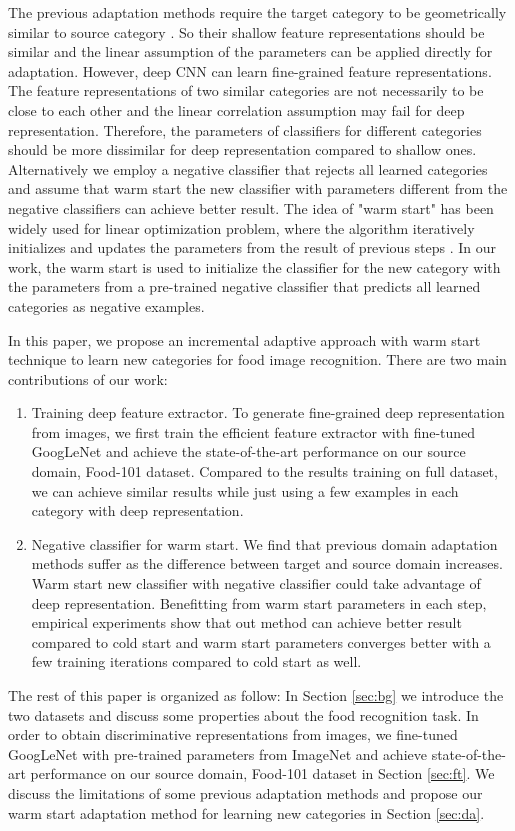 The previous adaptation methods require the target category to be geometrically similar to source category \cite{aytar2011tabula}. So their shallow feature representations should be similar and the linear assumption of the parameters can be applied directly for adaptation.
However, deep CNN can learn fine-grained feature representations. The feature representations of two similar categories are not necessarily to be close to each other and the linear correlation assumption may fail for deep representation. Therefore, the parameters of classifiers for different categories should be more dissimilar for deep representation compared to shallow ones. Alternatively we employ a negative classifier that rejects all learned categories and assume that warm start the new classifier with parameters different from the negative classifiers can achieve better result.
The idea of "warm start" has been widely used for linear optimization problem, where the algorithm iteratively initializes and updates the parameters from the result of previous steps \cite{yildirim2002warm} \cite{john2008implementation} \cite{zeilinger2011real} \cite{chuwarm}. In our work, the warm start is used to initialize the classifier for the new category with the parameters from a pre-trained negative classifier that predicts all learned categories as negative examples.

 In this paper, we propose an incremental adaptive approach with warm start technique to learn new categories for food image recognition. There are two main contributions of our work:
\begin{enumerate}
  \item Training deep feature extractor. To generate fine-grained deep representation from images, we first train the efficient feature extractor with fine-tuned GoogLeNet and achieve the state-of-the-art performance on our source domain, Food-101 dataset. Compared to the results training on full dataset, we can achieve similar results while just using a few examples in each category with deep representation.
  \item Negative classifier for warm start. We find that previous domain adaptation methods suffer as the difference between target and source domain increases. Warm start new classifier with negative classifier could take advantage of deep representation. Benefitting from warm start parameters in each step, empirical experiments show that out method can achieve better result compared to cold start and warm start parameters converges better with a few training iterations compared to cold start as well.
\end{enumerate}

The rest of this paper is organized as follow: In Section \ref{sec:bg} we introduce the two datasets and discuss some properties about the food recognition task. In order to obtain discriminative representations from images, we fine-tuned GoogLeNet with pre-trained parameters from ImageNet and achieve state-of-the-art performance on our source domain, Food-101 dataset in Section \ref{sec:ft}. We discuss the limitations of some previous adaptation methods and propose our warm start adaptation method for learning new categories in Section \ref{sec:da}.
